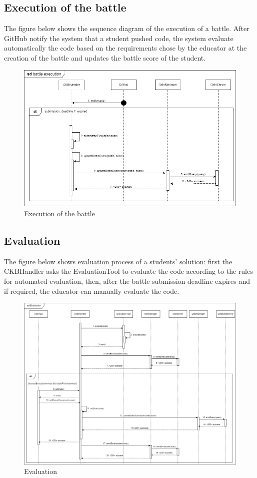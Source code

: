 \subsection{Execution of the battle}
The figure below shows the sequence diagram of the execution of a battle. After GitHub notify the system that a student pushed code, the system
evaluate automatically the code based on the requirements chose by the educator at the creation of the battle and
updates the battle score of the student.
\begin{figure}[H]
    \centering
    \includegraphics[width=1\textwidth]{images/seq_diagrams/battle_execution_DD.png}
    \caption{Execution of the battle}
\end{figure}
\clearpage

\subsection{Evaluation}
The figure below shows evaluation process of a students' solution: first the CKBHandler asks the EvaluationTool to evaluate the 
code according to the rules for automated evaluation, then, after the battle submission deadline expires and if required, the 
educator can manually evaluate the code.\\
\begin{figure}[H]
    \centering
    \includegraphics[width=1\textwidth]{images/seq_diagrams/evaluation_DD.png}
    \caption{Evaluation}
\end{figure}
\clearpage

